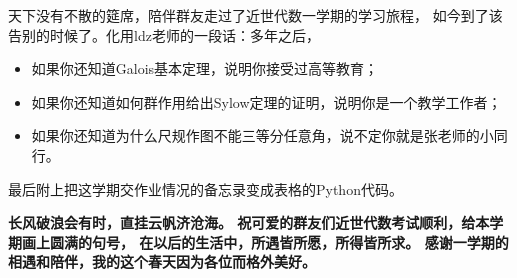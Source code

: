 \documentclass[12pt, a4paper, fontset=windows]{ctexart}
\begin{document}
天下没有不散的筵席，陪伴群友走过了近世代数一学期的学习旅程，
如今到了该告别的时候了。化用ldz老师的一段话：多年之后，
\begin{itemize}[itemsep=0pt]
\item 如果你还知道Galois基本定理，说明你接受过高等教育；
\item 如果你还知道如何群作用给出Sylow定理的证明，说明你是一个教学工作者；
\item 如果你还知道为什么尺规作图不能三等分任意角，说不定你就是张老师的小同行。
\end{itemize}

最后附上把这学期交作业情况的备忘录变成表格的Python代码。



\vspace{1em}

{\bf\large 长风破浪会有时，直挂云帆济沧海。
祝可爱的群友们近世代数考试顺利，给本学期画上圆满的句号，
在以后的生活中，所遇皆所愿，所得皆所求。
感谢一学期的相遇和陪伴，我的这个春天因为各位而格外美好。}

\clearpage
\part*{}
\def\refname{\LARGE 参考文献}
\centering
\end{document}
